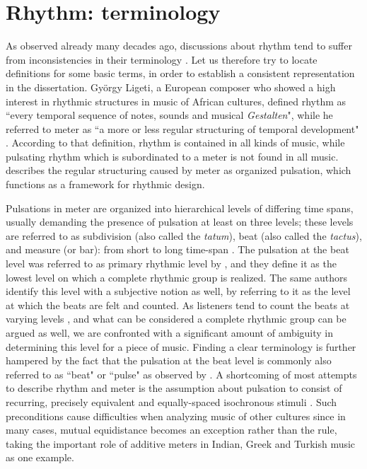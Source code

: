 \section{Rhythm: terminology}
As observed already many decades ago, discussions about rhythm tend to suffer from inconsistencies in their terminology \cite{sachs:53:rhythm}. Let us therefore try to locate definitions for some basic terms, in order to establish a consistent representation in the dissertation. Gy\"orgy Ligeti, a European composer who showed a high interest in rhythmic structures in music of African cultures, defined rhythm as ``every temporal sequence of notes, sounds and musical \textit{Gestalten}", while he referred to meter as ``a more or less regular structuring of temporal development" \cite{ligeti:07:schriften}. According to that definition, rhythm is contained in all kinds of music, while pulsating rhythm which is subordinated to a meter is not found in all music.  describes the regular structuring caused by meter as organized pulsation, which functions as a framework for rhythmic design. 

Pulsations in meter are organized into hierarchical levels of differing time spans, usually demanding the presence of pulsation at least on three levels; these levels are referred to as subdivision (also called the \textit{tatum}), beat (also called the \textit{tactus}), and measure (or bar): from short to long time-span \cite[accessed June 2016]{london:12:grovemeter}. The pulsation at the beat level was referred to as primary rhythmic level by , and they define it as the lowest level on which a complete rhythmic group is realized. The same authors identify this level with a subjective notion as well, by referring to it as the level at which the beats are felt and counted. As listeners tend to count the beats at varying levels \cite{parncutt:94:perception,muller:11:intro}, and what can be considered a complete rhythmic group can be argued as well, we are confronted with a significant amount of ambiguity in determining this level for a piece of music. Finding a clear terminology is further hampered by the fact that the pulsation at the beat level is commonly also referred to as ``beat" or ``pulse" as observed by . A shortcoming of most attempts to describe rhythm and meter is the assumption about pulsation to consist of recurring, precisely equivalent and equally-spaced isochronous  stimuli \cite{lerdahl:83:generative}. Such preconditions cause difficulties when analyzing music of other cultures since in many cases, mutual equidistance becomes an exception rather than the rule, taking the important role of additive meters in Indian, Greek and Turkish music as one example. 

